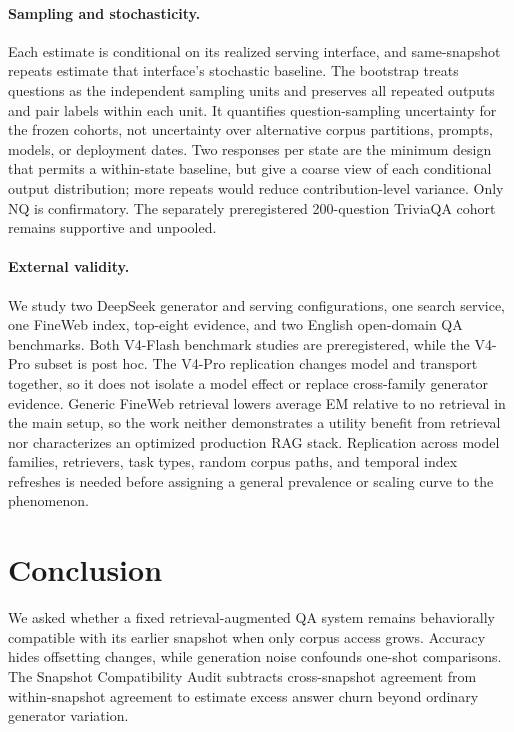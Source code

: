 \documentclass[sigconf,nonacm]{acmart}
\begin{document}
\paragraph{Sampling and stochasticity.} Each estimate is conditional on its realized serving interface, and same-snapshot repeats estimate that interface's stochastic baseline. The bootstrap treats questions as the independent sampling units and preserves all repeated outputs and pair labels within each unit.  It quantifies question-sampling uncertainty for the frozen cohorts, not uncertainty over alternative corpus partitions, prompts, models, or deployment dates.  Two responses per state are the minimum design that permits a within-state baseline, but give a coarse view of each conditional output distribution; more repeats would reduce contribution-level variance. Only NQ is confirmatory. The separately preregistered 200-question TriviaQA cohort remains supportive and unpooled.

\paragraph{External validity.} We study two DeepSeek generator and serving configurations, one search service, one FineWeb index, top-eight evidence, and two English open-domain QA benchmarks. Both V4-Flash benchmark studies are preregistered, while the V4-Pro subset is post hoc. The V4-Pro replication changes model and transport together, so it does not isolate a model effect or replace cross-family generator evidence. Generic FineWeb retrieval lowers average EM relative to no retrieval in the main setup, so the work neither demonstrates a utility benefit from retrieval nor characterizes an optimized production RAG stack. Replication across model families, retrievers, task types, random corpus paths, and temporal index refreshes is needed before assigning a general prevalence or scaling curve to the phenomenon.

\section{Conclusion}

We asked whether a fixed retrieval-augmented QA system remains behaviorally compatible with its earlier snapshot when only corpus access grows. Accuracy hides offsetting changes, while generation noise confounds one-shot comparisons. The Snapshot Compatibility Audit subtracts cross-snapshot agreement from within-snapshot agreement to estimate excess answer churn beyond ordinary generator variation.
\end{document}
